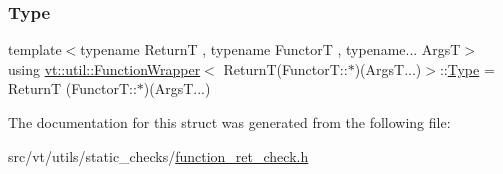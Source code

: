 \mbox{\label{structvt_1_1util_1_1_function_wrapper_3_01_return_t_07_functor_t_1_1_5_08_07_args_t_8_8_8_08_4_a5c150c8595cfe179fe3edc7ceca7d354}} 
\subsubsection{\texorpdfstring{Type}{Type}}
{\footnotesize\ttfamily template$<$typename ReturnT , typename FunctorT , typename... ArgsT$>$ \\
using \hyperlink{structvt_1_1util_1_1_function_wrapper}{vt\+::util\+::\+Function\+Wrapper}$<$ ReturnT(Functor\+T\+::$\ast$)(Args\+T...)$>$\+::\hyperlink{structvt_1_1util_1_1_function_wrapper_3_01_return_t_07_functor_t_1_1_5_08_07_args_t_8_8_8_08_4_a5c150c8595cfe179fe3edc7ceca7d354}{Type} =  ReturnT (Functor\+T\+::$\ast$)(Args\+T...)}



The documentation for this struct was generated from the following file\+:\begin{DoxyCompactItemize}
\item 
src/vt/utils/static\+\_\+checks/\hyperlink{function__ret__check_8h}{function\+\_\+ret\+\_\+check.\+h}\end{DoxyCompactItemize}
